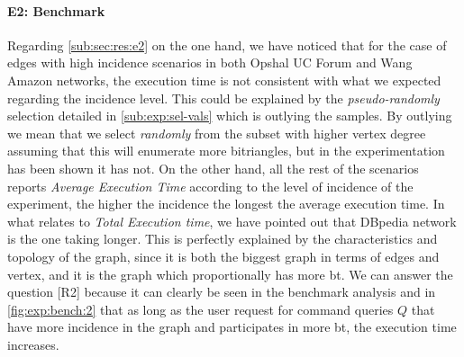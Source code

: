 \paragraph{E2: Benchmark} Regarding \autoref{sub:sec:res:e2} on the one hand, we have noticed that for the case of edges with high incidence scenarios in both Opshal UC Forum and Wang Amazon networks, the execution time is not consistent with what we expected regarding the incidence level. 
This could be explained by the \emph{pseudo-randomly} selection detailed in \autoref{sub:exp:sel-vals} which is outlying the samples. By outlying we mean that we select \emph{randomly} from the subset with higher vertex degree assuming that this will enumerate more bitriangles, but in the experimentation has been shown it has not.
On the other hand, all the rest of the scenarios reports \emph{Average Execution Time} according to the level of incidence of the experiment, the higher the incidence the longest the average execution time. 
In what relates to \emph{Total Execution time}, we have pointed out that DBpedia network is the one taking longer. This is perfectly explained by the characteristics and topology of the graph, since it is both the biggest graph in terms of edges and vertex, and it is the graph which proportionally has more \acrshort{bt}. 
We can answer the question [R2] because it can clearly be seen in the benchmark analysis and in \autoref{fig:exp:bench:2} that as long as the user request for command queries $Q$ that have more incidence in the graph and participates in more \acrshort{bt},
the execution time increases.


